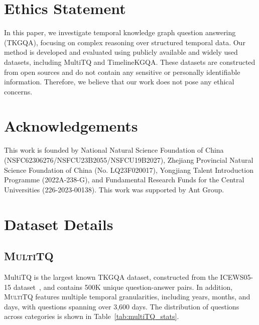 \documentclass[11pt]{article}
\begin{document}
\section*{Ethics Statement}
In this paper, we investigate temporal knowledge graph question answering (TKGQA), focusing on complex reasoning over structured temporal data. Our method is developed and evaluated using publicly available and widely used datasets, including MultiTQ and TimelineKGQA. These datasets are constructed from open sources and do not contain any sensitive or personally identifiable information. Therefore, we believe that our work does not pose any ethical concerns.

\section*{Acknowledgements}
This work is founded by National Natural Science Foundation of China (NSFC62306276/\allowbreak NSFCU23B2055/\allowbreak NSFCU19B2027), Zhejiang Provincial Natural Science Foundation of China (No. LQ23F020017), Yongjiang Talent Introduction Programme (2022A-238-G), and Fundamental Research Funds for the Central Universities (226-2023-00138). This work was supported by Ant Group.


%


\appendix

\section{Dataset Details}
\label{A:dataset}
\subsection{\textsc{MultiTQ}}
MultiTQ is the largest known TKGQA dataset, constructed from the ICEWS05-15 dataset~\citep{garcia2018learning}, and contains 500K unique question-answer pairs. In addition, \textsc{MultiTQ} features multiple temporal granularities, including years, months, and days, with questions spanning over 3,600 days. The distribution of questions across categories is shown in Table~\ref{tab:multiTQ_stats}. 
\end{document}
